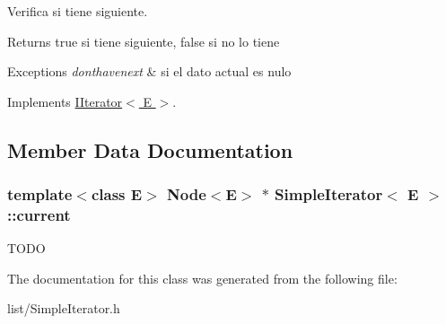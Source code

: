 Verifica si tiene siguiente. 

\begin{DoxyReturn}{Returns}
true si tiene siguiente, false si no lo tiene 
\end{DoxyReturn}

\begin{DoxyExceptions}{Exceptions}
{\em donthavenext} & si el dato actual es nulo \\
\hline
\end{DoxyExceptions}


Implements \hyperlink{class_i_iterator_a8a73f0fb41a66fe98e5e636378759196}{I\-Iterator$<$ E $>$}.



\subsection{Member Data Documentation}
\hypertarget{class_simple_iterator_a7777fefe265a5067ec9319d8c1a3e278}{
\subsubsection[{current}]{\setlength{\rightskip}{0pt plus 5cm}template$<$class E$>$ {\bf Node}$<$E$>$ $\ast$ {\bf Simple\-Iterator}$<$ E $>$\-::current\hspace{0.3cm}{\ttfamily [protected]}}}\label{class_simple_iterator_a7777fefe265a5067ec9319d8c1a3e278}
T\-O\-D\-O 

The documentation for this class was generated from the following file\-:\begin{DoxyCompactItemize}
\item 
list/Simple\-Iterator.\-h\end{DoxyCompactItemize}
